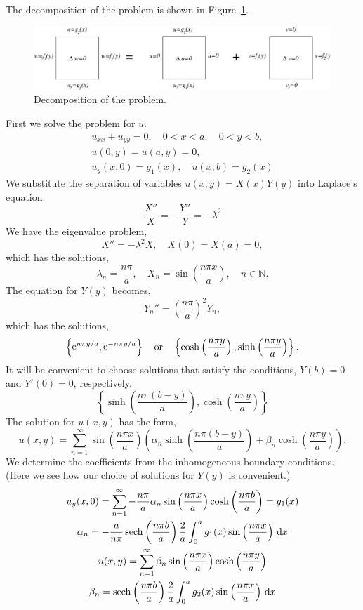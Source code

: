 {%
\begin{Solution}
The decomposition of the problem is shown in Figure~\ref{lap_rect}.
\begin{figure}[h!]
\begin{center}
\includegraphics[width=\textwidth]{pde/laplace/lap_rect}
\end{center}
\caption{Decomposition of the problem.}
\label{lap_rect}
\end{figure}


First we solve the problem for $u$.
\begin{gather*}
u_{x x} + u_{y y} = 0, \quad 0 < x < a, \quad 0 < y < b, \\
u(0, y) = u(a, y) = 0, \\
u_y(x, 0) = g_1(x), \quad u(x, b) = g_2(x)
\end{gather*}
We substitute the separation of variables $u(x, y) = X(x) Y(y)$ into 
Laplace's equation.
\[
\frac{X''}{X} = - \frac{Y''}{Y} = - \lambda^2
\]
We have the eigenvalue problem,
\[
X'' = - \lambda^2 X, \quad X(0) = X(a) = 0,
\]
which has the solutions,
\[
\lambda_n = \frac{n \pi}{a}, \quad X_n = \sin \left( \frac{n \pi x}{a} \right),
        \quad n \in \mathbb{N}.
\]
The equation for $Y(y)$ becomes,
\[
Y_n'' = \left( \frac{n \pi}{a} \right)^2 Y_n,
\]
which has the solutions,
\[
\left\{
\mathop{\mathrm{e}}\nolimits^{n \pi y / a}, \mathop{\mathrm{e}}\nolimits^{-n \pi y / a}
\right\}
\quad \mathrm{or} \quad
\left\{
\cosh\left( \frac{n \pi y}{a} \right), \sinh\left( \frac{n \pi y}{a} \right)
\right\}.
\]
It will be convenient to choose solutions that satisfy the conditions,
$Y(b) = 0$ and $Y'(0) = 0$, respectively.
\[
\left\{
\sinh \left( \frac{n \pi (b - y)}{a} \right),
\cosh\left( \frac{n \pi y}{a} \right)
\right\}
\]
The solution for $u(x, y)$ has the form,
\[
u(x, y) = \sum_{n = 1}^\infty \sin \left( \frac{n \pi x}{a} \right)
        \left( \alpha_n \sinh \left( \frac{n \pi (b - y)}{a} \right)
        + \beta_n \cosh\left( \frac{n \pi y}{a} \right) \right).
\]
We determine the coefficients from the inhomogeneous boundary conditions.
(Here we see how our choice of solutions for $Y(y)$ is convenient.)
\begin{gather*}
u_y(x, 0) = \sum_{n = 1}^\infty - \frac{n \pi}{a} \alpha_n 
        \sin \left( \frac{n \pi x}{a} \right)
        \cosh \left( \frac{n \pi b}{a} \right) = g_1(x) \\
\alpha_n = - \frac{a}{n \pi} \mathop{\mathrm{sech}}\nolimits \left( \frac{n \pi b}{a} \right)
        \frac{2}{a} \int_0^a g_1(x) \sin \left( \frac{n \pi x}{a}\right)\,\mathrm{d} x\\
u(x, y) = \sum_{n = 1}^\infty \beta_n \sin \left( \frac{n \pi x}{a} \right)
        \cosh\left( \frac{n \pi y}{a} \right) \\
\beta_n = \mathop{\mathrm{sech}}\nolimits \left( \frac{n \pi b}{a} \right)
        \frac{2}{a} \int_0^a g_2(x) \sin \left( \frac{n \pi x}{a} \right)\,\mathrm{d} x
\end{gather*}



\end{Solution}}
